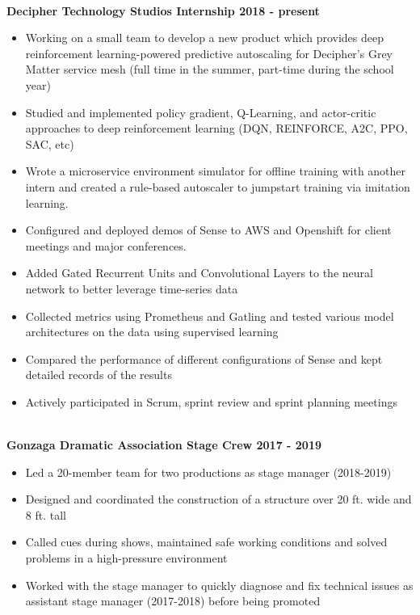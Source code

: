\documentclass{article}
\begin{document}
\begin{center}
\begin{flushleft}
    {\large\textbf{\underline{}}} \\
    \textbf{Decipher Technology Studios Internship \hfill 2018 - present}
    \begin{itemize}
      \item Working on a small team to develop a new product which provides deep reinforcement learning-powered predictive autoscaling for Decipher’s Grey Matter service mesh (full time in the summer, part-time during the school year)
      \item Studied and implemented policy gradient, Q-Learning, and actor-critic approaches to deep reinforcement learning (DQN, REINFORCE, A2C, PPO, SAC, etc)
      \item Wrote a microservice environment simulator for offline training with another intern and created a rule-based autoscaler to jumpstart training via imitation learning.
      \item Configured and deployed demos of Sense to AWS and Openshift for client meetings and major conferences.
      \item Added Gated Recurrent Units and Convolutional Layers to the neural network to better leverage time-series data
      \item Collected metrics using Prometheus and Gatling and tested various model architectures on the data using supervised learning
      \item Compared the performance of different configurations of Sense and kept detailed records of the results
      \item Actively participated in Scrum, sprint review and sprint planning meetings
    \end{itemize}


    {\large\textbf{\underline{}}} \\
    \textbf{Gonzaga Dramatic Association Stage Crew \hfill 2017 - 2019}
    \begin{itemize}
      \item Led a 20-member team for two productions as stage manager (2018-2019)
      \item Designed and coordinated the construction of a structure over 20 ft. wide and 8 ft. tall
      \item Called cues during shows, maintained safe working conditions and solved problems in a high-pressure environment
      \item Worked with the stage manager to quickly diagnose and fix technical issues as assistant stage manager (2017-2018) before being promoted
    \end{itemize}


\end{flushleft}
\end{center}
\end{document}
